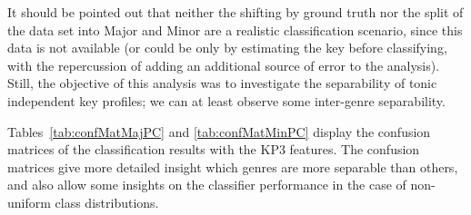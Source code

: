 \documentclass{article}
\begin{document}
It should be pointed out that neither the shifting by ground truth nor the split of the data set into Major and Minor are a realistic classification scenario, since this data is not available (or could be only by estimating the key before classifying, with the repercussion of adding an additional source of error to the analysis). 
Still, the objective of this analysis was to investigate the separability of tonic independent key profiles; we can at least observe some inter-genre separability.



Tables~\ref{tab:confMatMajPC} and \ref{tab:confMatMinPC} display the confusion matrices of the classification results with the KP3 features. The confusion matrices give more detailed insight which genres are more separable than others, and also allow some insights on the classifier performance in the case of non-uniform class distributions.


\end{document}

